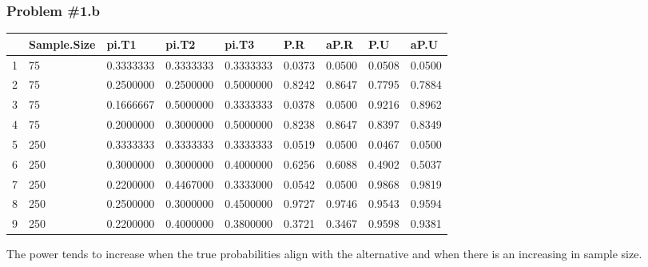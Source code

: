\documentclass[12pt, letterpaper]{article}
\begin{document}
\newpage 

\subsubsection*{Problem {\#}1.b}  
\begin{table}[ht]
	\centering
	\begin{tabular}{rllllllll}
		\hline
		& Sample.Size & pi.T1 & pi.T2 & pi.T3 & P.R & aP.R & P.U & aP.U \\ 
		\hline
		1 &  75 & 0.3333333 & 0.3333333 & 0.3333333 & 0.0373 & 0.0500 & 0.0508 & 0.0500 \\ 
		2 &  75 & 0.2500000 & 0.2500000 & 0.5000000 & 0.8242 & 0.8647 & 0.7795 & 0.7884 \\ 
		3 &  75 & 0.1666667 & 0.5000000 & 0.3333333 & 0.0378 & 0.0500 & 0.9216 & 0.8962 \\ 
		4 &  75 & 0.2000000 & 0.3000000 & 0.5000000 & 0.8238 & 0.8647 & 0.8397 & 0.8349 \\ 
		5 & 250 & 0.3333333 & 0.3333333 & 0.3333333 & 0.0519 & 0.0500 & 0.0467 & 0.0500 \\ 
		6 & 250 & 0.3000000 & 0.3000000 & 0.4000000 & 0.6256 & 0.6088 & 0.4902 & 0.5037 \\ 
		7 & 250 & 0.2200000 & 0.4467000 & 0.3333000 & 0.0542 & 0.0500 & 0.9868 & 0.9819 \\ 
		8 & 250 & 0.2500000 & 0.3000000 & 0.4500000 & 0.9727 & 0.9746 & 0.9543 & 0.9594 \\ 
		9 & 250 & 0.2200000 & 0.4000000 & 0.3800000 & 0.3721 & 0.3467 & 0.9598 & 0.9381 \\ 
		\hline
	\end{tabular}
\end{table}
The power tends to increase when the true probabilities align with the alternative and when there is an increasing in sample size.  
\end{document}
